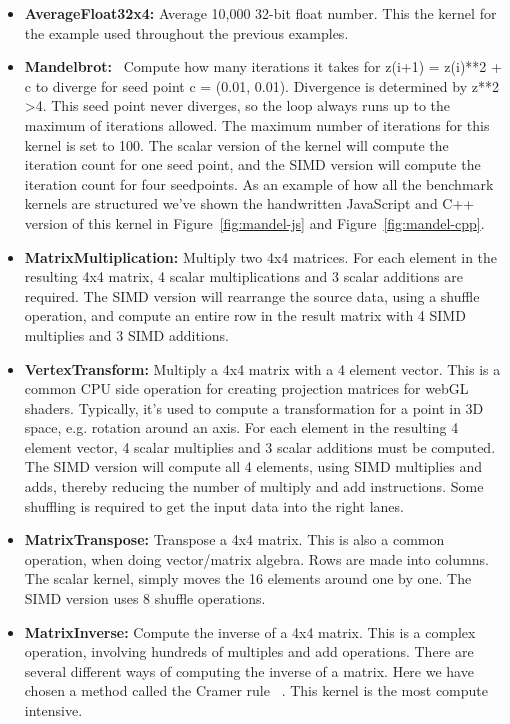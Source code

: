 \documentclass[preprint]{sigplanconf}
\begin{document}
\begin{itemize}
\item
\textbf{AverageFloat32x4:} Average 10,000 32-bit float number.  This 
the kernel for the example used throughout the previous examples.

\item
\textbf{Mandelbrot:}~\cite{mandelbrot} Compute how many iterations it takes for
z(i+1) = z(i)**2 + c to diverge for seed point c = (0.01, 0.01).
Divergence is determined by z**2 \textgreater 4. This seed point never diverges, so
the loop always runs up to the maximum of iterations allowed.  The
maximum number of iterations for this kernel is set to 100.  The scalar version
of the kernel will compute the iteration count for one seed point, and
the SIMD version will compute the iteration count for four seedpoints.
As an example of how all the benchmark kernels are structured we've shown
the handwritten JavaScript and C++ version of this kernel in Figure~\ref{fig:mandel-js}
and Figure~\ref{fig:mandel-cpp}.

\item
\textbf{MatrixMultiplication:} Multiply two 4x4 matrices.  For each element in
the resulting 4x4 matrix, 4 scalar multiplications and 3 scalar additions are
required.  The SIMD version will rearrange the source data, using a shuffle operation,
and compute an entire row in the result matrix with 4 SIMD multiplies and 3 SIMD additions.

\item
\textbf{VertexTransform:} Multiply a 4x4 matrix with a 4 element vector.  This
is a common CPU side operation for creating projection matrices for webGL shaders.
Typically, it's used to compute a transformation for a point in 3D space, e.g. rotation
around an axis.  For each element in the resulting 4 element vector, 4 scalar multiplies
and 3 scalar additions must be computed.  The SIMD version will compute all 4 elements,
using SIMD multiplies and adds, thereby reducing the number of multiply and add instructions.
Some shuffling is required to get the input data into the right lanes.

\item
\textbf{MatrixTranspose:} Transpose a 4x4 matrix.  This is also a common operation, when
doing vector/matrix algebra.  Rows are made into columns.  The scalar kernel, simply moves
the 16 elements around one by one.  The SIMD version uses 8 shuffle operations.

\item
\textbf{MatrixInverse:} Compute the inverse of a 4x4 matrix.  This is a complex operation,
involving hundreds of multiples and add operations.  There are several different ways
of computing the inverse of a matrix.  Here we have chosen a method called the Cramer rule
~\cite{cramer-rule}.  This kernel is the most compute intensive.

\end{itemize}
\end{document}
